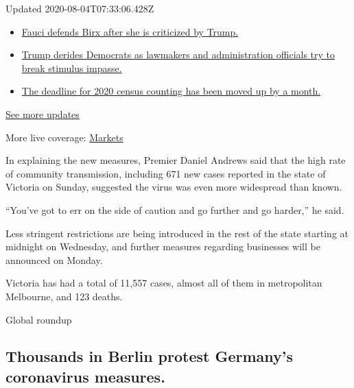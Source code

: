 Updated 2020-08-04T07:33:06.428Z

\begin{itemize}
\tightlist
\item
  \href{https://www.nytimes.com/2020/08/03/world/coronavirus-covid-19.html?action=click\&pgtype=Article\&state=default\&region=MAIN_CONTENT_1\&context=storylines_live_updates\#link-4547638f}{Fauci
  defends Birx after she is criticized by Trump.}
\item
  \href{https://www.nytimes.com/2020/08/03/world/coronavirus-covid-19.html?action=click\&pgtype=Article\&state=default\&region=MAIN_CONTENT_1\&context=storylines_live_updates\#link-15e7f995}{Trump
  derides Democrats as lawmakers and administration officials try to
  break stimulus impasse.}
\item
  \href{https://www.nytimes.com/2020/08/03/world/coronavirus-covid-19.html?action=click\&pgtype=Article\&state=default\&region=MAIN_CONTENT_1\&context=storylines_live_updates\#link-e5a2cda}{The
  deadline for 2020 census counting has been moved up by a month.}
\end{itemize}

\href{https://www.nytimes.com/2020/08/03/world/coronavirus-covid-19.html?action=click\&pgtype=Article\&state=default\&region=MAIN_CONTENT_1\&context=storylines_live_updates}{See
more updates}

More live coverage:
\href{https://www.nytimes.com/live/2020/08/03/business/stock-market-today-coronavirus?action=click\&pgtype=Article\&state=default\&region=MAIN_CONTENT_1\&context=storylines_live_updates}{Markets}

In explaining the new measures, Premier Daniel Andrews said that the
high rate of community transmission, including 671 new cases reported in
the state of Victoria on Sunday, suggested the virus was even more
widespread than known.

``You've got to err on the side of caution and go further and go
harder,'' he said.

Less stringent restrictions are being introduced in the rest of the
state starting at midnight on Wednesday, and further measures regarding
businesses will be announced on Monday.

Victoria has had a total of 11,557 cases, almost all of them in
metropolitan Melbourne, and 123 deaths.

Global roundup

\hypertarget{thousands-in-berlin-protest-germanys-coronavirus-measures}{%
\subsection{Thousands in Berlin protest Germany's coronavirus
measures.}\label{thousands-in-berlin-protest-germanys-coronavirus-measures}}

